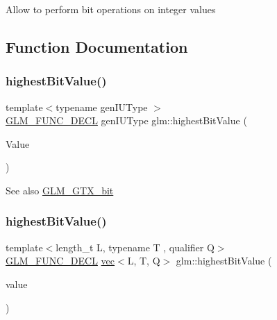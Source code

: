 Allow to perform bit operations on integer values 

\subsection{Function Documentation}
\mbox{\label{group__gtx__bit_ga0dcc8fe7c3d3ad60dea409281efa3d05}} 
\subsubsection{\texorpdfstring{highest\+Bit\+Value()}{highestBitValue()}\hspace{0.1cm}{\footnotesize\ttfamily [1/2]}}
{\footnotesize\ttfamily template$<$typename gen\+I\+U\+Type $>$ \\
\mbox{\hyperlink{setup_8hpp_ab2d052de21a70539923e9bcbf6e83a51}{G\+L\+M\+\_\+\+F\+U\+N\+C\+\_\+\+D\+E\+CL}} gen\+I\+U\+Type glm\+::highest\+Bit\+Value (\begin{DoxyParamCaption}\item[{gen\+I\+U\+Type}]{Value }\end{DoxyParamCaption})}

\begin{DoxySeeAlso}{See also}
\mbox{\hyperlink{group__gtx__bit}{G\+L\+M\+\_\+\+G\+T\+X\+\_\+bit}} 
\end{DoxySeeAlso}
\mbox{\label{group__gtx__bit_ga898ef075ccf809a1e480faab48fe96bf}} 
\subsubsection{\texorpdfstring{highest\+Bit\+Value()}{highestBitValue()}\hspace{0.1cm}{\footnotesize\ttfamily [2/2]}}
{\footnotesize\ttfamily template$<$length\+\_\+t L, typename T , qualifier Q$>$ \\
\mbox{\hyperlink{setup_8hpp_ab2d052de21a70539923e9bcbf6e83a51}{G\+L\+M\+\_\+\+F\+U\+N\+C\+\_\+\+D\+E\+CL}} \mbox{\hyperlink{structglm_1_1vec}{vec}}$<$L, T, Q$>$ glm\+::highest\+Bit\+Value (\begin{DoxyParamCaption}\item[{\mbox{\hyperlink{structglm_1_1vec}{vec}}$<$ L, T, Q $>$ const \&}]{value }\end{DoxyParamCaption})}

